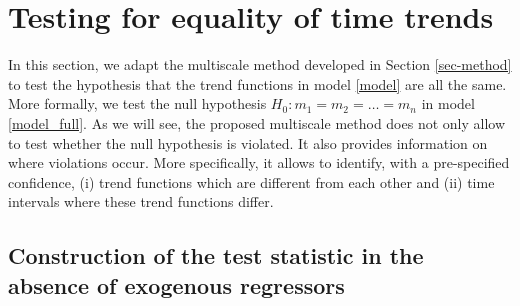 \section{Testing for equality of time trends}\label{sec-test-equality}

In this section, we adapt the multiscale method developed in Section \ref{sec-method} to test the hypothesis that the trend functions in model \eqref{model} are all the same. More formally, we test the null hypothesis $H_0: m_1 = m_2 = \ldots = m_n$ in model \eqref{model_full}. As we will see, the proposed multiscale method does not only allow to test whether the null hypothesis is violated. It also provides information on where violations occur. More specifically, it allows to identify, with a pre-specified confidence, (i) trend functions which are different from each other and (ii) time intervals where these trend functions differ.


\subsection{Construction of the test statistic in the absence of exogenous regressors}\label{subsec-test-equality-stat-without-regs}

